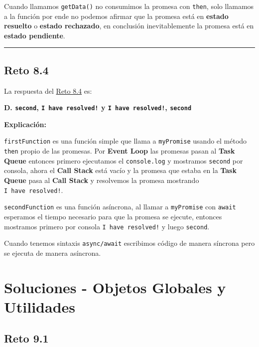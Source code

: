 \documentclass[
  letterpaper,
  DIV=11,
  numbers=noendperiod]{scrreprt}
\begin{document}
Cuando llamamos \texttt{getData()} no consumimos la promesa con
\texttt{then}, solo llamamos a la función por ende no podemos afirmar
que la promesa está en \textbf{estado resuelto} o \textbf{estado
rechazado}, en conclusión inevitablemente la promesa está en
\textbf{estado pendiente}.

\begin{center}\rule{0.5\linewidth}{0.5pt}\end{center}

\section{Reto 8.4}\label{sec-sol-cap8-reto4}

La respuesta del \hyperref[sec-cap8-reto4]{Reto 8.4} es:

\textbf{D. \texttt{second}, \texttt{I\ have\ resolved!} y
\texttt{I\ have\ resolved!}, \texttt{second}}

\textbf{Explicación:}

\texttt{firstFunction} es una función simple que llama a
\texttt{myPromise} usando el método \texttt{then} propio de las
promesas. Por \textbf{Event Loop} las promesas pasan al \textbf{Task
Queue} entonces primero ejecutamos el \texttt{console.log} y mostramos
\texttt{second} por consola, ahora el \textbf{Call Stack} está vacío y
la promesa que estaba en la \textbf{Task Queue} pasa al \textbf{Call
Stack} y resolvemos la promesa mostrando
\texttt{\textquotesingle{}I\ have\ resolved!\textquotesingle{}}.

\texttt{secondFunction} es una función asíncrona, al llamar a
\texttt{myPromise} con \texttt{await} esperamos el tiempo necesario para
que la promesa se ejecute, entonces mostramos primero por consola
\texttt{\textquotesingle{}I\ have\ resolved!\textquotesingle{}} y luego
\texttt{second}.

Cuando tenemos sintaxis \texttt{async/await} escribimos código de manera
síncrona pero se ejecuta de manera asíncrona.

\chapter{Soluciones - Objetos Globales y
Utilidades}\label{soluciones---objetos-globales-y-utilidades}

\section{Reto 9.1}\label{sec-sol-cap9-reto1}
\end{document}
